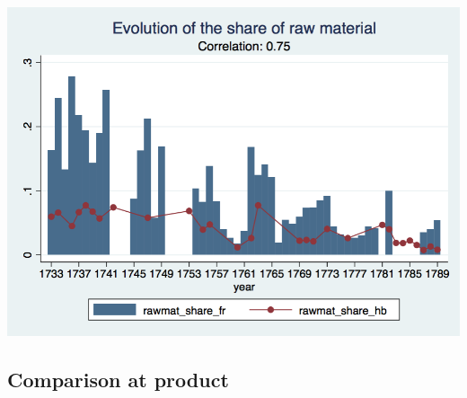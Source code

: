 \documentclass[12pt,a4paper,titlepage]{article}
\begin{document}
\includegraphics[scale=.28]{rawmat_share.png}

\subsection{Comparison at product}
\end{document}
